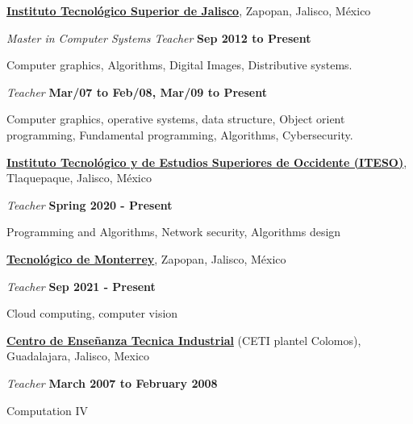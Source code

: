 
\href{https://www.tecmm.edu.mx/}
{\textbf{Instituto Tecnológico Superior de Jalisco}},
Zapopan, Jalisco, México
\begin{outerlist}
\item[] \textit{Master in Computer Systems Teacher}%
    \hfill \textbf{Sep 2012 to Present }
    \begin{innerlist}
        \item Computer graphics, Algorithms, Digital Images, Distributive
		systems.
    \end{innerlist}
\item[] \textit{Teacher}%
    \hfill \textbf{Mar/07 to Feb/08, Mar/09 to Present}
    \begin{innerlist}
        \item Computer graphics, operative systems, data structure,
            Object orient programming, Fundamental programming, Algorithms,
	    Cybersecurity.
    \end{innerlist}
\end{outerlist}

\blankline

\href{https://iteso.mx/}
{\textbf{Instituto Tecnológico y de Estudios Superiores de Occidente (ITESO)}},
Tlaquepaque, Jalisco, México
\begin{outerlist}
\item[] \textit{Teacher}%
    \hfill \textbf{Spring 2020 - Present}
    \begin{innerlist}
        \item Programming and Algorithms, Network security, Algorithms
          design
    \end{innerlist}
\end{outerlist}

\blankline

\href{https://tec.mx/}
{\textbf{Tecnológico de Monterrey}},
Zapopan, Jalisco, México
\begin{outerlist}
\item[] \textit{Teacher}%
    \hfill \textbf{Sep 2021 - Present}
    \begin{innerlist}
        \item Cloud computing, computer vision
    \end{innerlist}
\end{outerlist}

\blankline

\href{http://www.colomos.ceti.mx/}{\textbf{Centro de Enseñanza Tecnica
Industrial}} (CETI plantel Colomos),
Guadalajara, Jalisco, Mexico 
\begin{outerlist}
\item[] \textit{Teacher}%
    \hfill \textbf{March 2007 to February 2008}
    \begin{innerlist}
        \item Computation IV
    \end{innerlist}
\end{outerlist}

